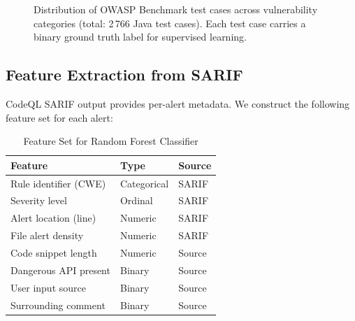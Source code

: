 \documentclass[conference]{IEEEtran}
\begin{document}
\begin{figure}[htbp]
  \centering
  \caption{Distribution of OWASP Benchmark test cases across vulnerability
           categories (total: 2\,766 Java test cases). Each test case carries
           a binary ground truth label for supervised learning.}
  \label{fig:owasp}
\end{figure}

\subsection{Feature Extraction from SARIF}

CodeQL SARIF output provides per-alert metadata. We construct the following
feature set for each alert:

\begin{table}[htbp]
  \centering
  \caption{Feature Set for Random Forest Classifier}
  \label{tab:features}
  \renewcommand{\arraystretch}{1.2}
  \begin{tabular}{lll}
    \toprule
    \textbf{Feature} & \textbf{Type} & \textbf{Source} \\
    \midrule
    Rule identifier (CWE) & Categorical & SARIF \\
    Severity level        & Ordinal     & SARIF \\
    Alert location (line) & Numeric     & SARIF \\
    File alert density    & Numeric     & SARIF \\
    Code snippet length   & Numeric     & Source \\
    Dangerous API present & Binary      & Source \\
    User input source     & Binary      & Source \\
    Surrounding comment   & Binary      & Source \\
    \bottomrule
  \end{tabular}
\end{table}
\end{document}
